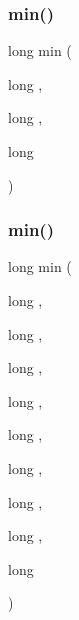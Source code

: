 \mbox{\label{adat-devel_2lib_2SU3_2SU3__internal_8h_a70ba16c38d0b4d794bfcd594b5293b98}} 
\subsubsection{\texorpdfstring{min()}{min()}\hspace{0.1cm}{\footnotesize\ttfamily [2/3]}}
{\footnotesize\ttfamily long min (\begin{DoxyParamCaption}\item[{long}]{,  }\item[{long}]{,  }\item[{long}]{ }\end{DoxyParamCaption})}

\mbox{\label{adat-devel_2lib_2SU3_2SU3__internal_8h_ab0f5fed3171eb00d1c5f037d9f518a23}} 
\subsubsection{\texorpdfstring{min()}{min()}\hspace{0.1cm}{\footnotesize\ttfamily [3/3]}}
{\footnotesize\ttfamily long min (\begin{DoxyParamCaption}\item[{long}]{,  }\item[{long}]{,  }\item[{long}]{,  }\item[{long}]{,  }\item[{long}]{,  }\item[{long}]{,  }\item[{long}]{,  }\item[{long}]{,  }\item[{long}]{ }\end{DoxyParamCaption})}

